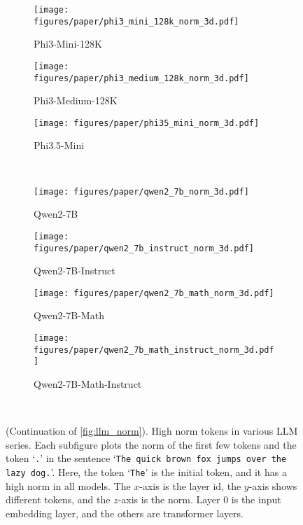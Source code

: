 \begin{figure*}[!t]
\begin{subfigure}[t]{0.23\textwidth}
        \texttt{[image: figures/paper/phi3\_mini\_128k\_norm\_3d.pdf]}
        \caption{Phi3-Mini-128K}\label{fig:phi3_mini_128k_norm_3d}
    \end{subfigure}
    \begin{subfigure}[t]{0.23\textwidth}
        \texttt{[image: figures/paper/phi3\_medium\_128k\_norm\_3d.pdf]}
        \caption{Phi3-Medium-128K}\label{fig:phi3_medium_128k_norm_3d}
    \end{subfigure}
    \begin{subfigure}[t]{0.23\textwidth}
        \texttt{[image: figures/paper/phi35\_mini\_norm\_3d.pdf]}
        \caption{Phi3.5-Mini}\label{fig:phi35_mini_norm_3d}
    \end{subfigure}\\
    \begin{subfigure}[t]{0.23\textwidth}
        \texttt{[image: figures/paper/qwen2\_7b\_norm\_3d.pdf]}
        \caption{Qwen2-7B}\label{fig:qwen2_7b_norm_3d}
    \end{subfigure}
    \begin{subfigure}[t]{0.23\textwidth}
        \texttt{[image: figures/paper/qwen2\_7b\_instruct\_norm\_3d.pdf]}
        \caption{Qwen2-7B-Instruct}\label{fig:qwen2_7b_instruct_norm_3d}
    \end{subfigure}
    \begin{subfigure}[t]{0.23\textwidth}
        \texttt{[image: figures/paper/qwen2\_7b\_math\_norm\_3d.pdf]}
        \caption{Qwen2-7B-Math}\label{fig:qwen2_7b_math_norm_3d}
    \end{subfigure}
    \begin{subfigure}[t]{0.23\textwidth}
        \texttt{[image: figures/paper/qwen2\_7b\_math\_instruct\_norm\_3d.pdf]}
        \caption{Qwen2-7B-Math-Instruct}\label{fig:qwen2_7b_math_instruct_norm_3d}
    \end{subfigure}
    \\
    \caption{(Continuation of \cref{fig:llm_norm}). High norm tokens in various LLM series.
        Each subfigure plots the norm of the first few tokens and the token `\texttt{.}' in the sentence `\texttt{The quick brown fox jumps over the lazy dog.}'.
        Here, the token `\texttt{The}' is the initial token, and it has a high norm in all models.
        The \(x\)-axis is the layer id, the \(y\)-axis shows different tokens, and the \(z\)-axis is the norm.
        Layer 0 is the input embedding layer, and the others are transformer layers.
    }\label{fig:more_llm_norm}
\end{figure*}

